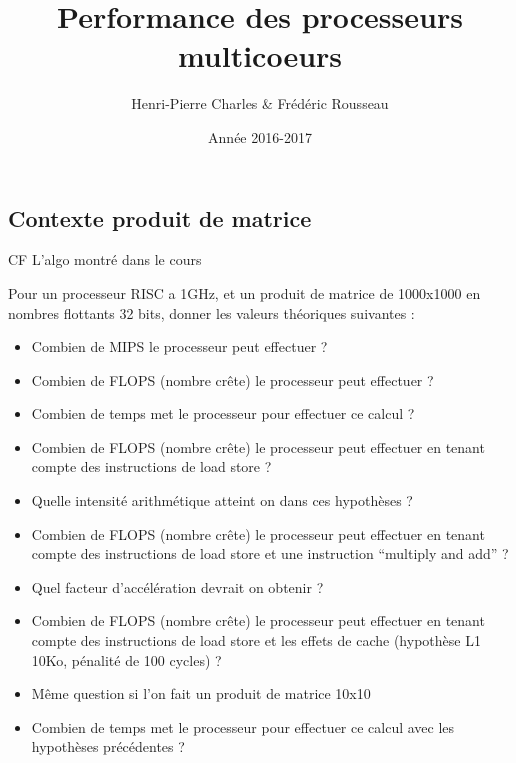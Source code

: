 \documentclass{beamer}
\title{Performance des processeurs multicoeurs}
\subtitle{}
\author{Henri-Pierre Charles \& Frédéric Rousseau}
\date{Année 2016-2017}
\begin{document}
\begin{frame}
\titlepage
\end{frame}

\begin{frame}
\section{Contexte produit de matrice}

CF L'algo montré dans le cours

Pour un processeur RISC a 1GHz, et un produit de matrice de 1000x1000
en nombres flottants 32 bits, donner les valeurs théoriques suivantes
:

\begin{itemize}
\item Combien de MIPS le processeur peut effectuer ?
\item Combien de FLOPS (nombre crête) le processeur peut effectuer ?
\item Combien de temps met le processeur pour effectuer ce calcul ?
\item Combien de FLOPS (nombre crête) le processeur peut effectuer
  en tenant compte des instructions de load store ?
\item Quelle intensité arithmétique atteint on dans ces hypothèses ?
\item Combien de FLOPS (nombre crête) le processeur peut effectuer en
  tenant compte des instructions de load store et une instruction
  ``multiply and add'' ?
\item Quel facteur d'accélération devrait on obtenir ?
\item Combien de FLOPS (nombre crête) le processeur peut effectuer
   en tenant compte des instructions de load store et les effets
   de cache (hypothèse L1 10Ko, pénalité de 100 cycles) ?
\item Même question si l'on fait un produit de matrice 10x10
 \item Combien de temps met le processeur pour effectuer ce calcul
   avec les hypothèses précédentes ?
\end{itemize}


  
\end{frame}
\end{document}
